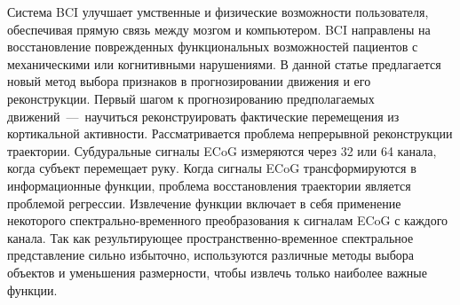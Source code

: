 \documentclass[12pt,twoside]{article}
\begin{document}
Система BCI улучшает умственные и физические возможности пользователя, обеспечивая прямую связь между мозгом и компьютером. BCI направлены на восстановление поврежденных функциональных возможностей пациентов с механическими или когнитивными нарушениями. В данной статье предлагается новый метод выбора признаков в прогнозировании движения и его реконструкции.
Первый шагом к прогнозированию предполагаемых движений~---~научиться реконструировать фактические перемещения из кортикальной активности. Рассматривается проблема непрерывной реконструкции траектории. Субдуральные сигналы ECoG измеряются через 32 или 64 канала, когда субъект перемещает руку. 
Когда сигналы ECoG трансформируются в информационные функции, проблема восстановления траектории является проблемой регрессии. Извлечение функции включает в себя применение некоторого спектрально-временного преобразования к сигналам ECoG с каждого канала. 
Так как результирующее пространственно-временное спектральное представление сильно избыточно, используются различные методы выбора объектов и уменьшения размерности,  
чтобы извлечь только наиболее важные функции.
\end{document}

